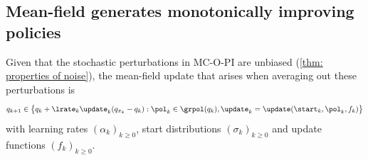 \subsection{Mean-field generates monotonically improving policies}

Given that the stochastic perturbations in MC-O-PI are unbiased (\autoref{thm: properties of noise}),
the mean-field update that arises when averaging out these perturbations is
\begin{align}
\label{eq: deterministic mcopi}
    q_{k+1}
    \in
    \big\{ q_k + \lrate_k \update_k ( q_{\pi_k} - q_k )
    :
    \pol_k \in \grpol(q_k),
    \update_k = \update(\start_k, \pol_k, f_k)
    \big\}
\end{align}
with learning rates $(\alpha_k)_{k\ge 0}$, start distributions $(\sigma_k)_{k\ge 0}$ and update functions $(f_k)_{k\ge 0}$.








